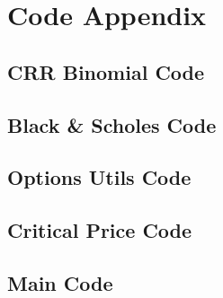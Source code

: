 \documentclass{article}
\begin{document}
\pagebreak

\appendix
\section{Code Appendix}
\subsection{CRR Binomial Code}\label{binomial}


\subsection{Black \& Scholes Code}\label{blackscholes}


\subsection{Options Utils Code}\label{options}



\subsection{Critical Price Code}\label{critical}



\subsection{Main Code}\label{main}

\end{document}
